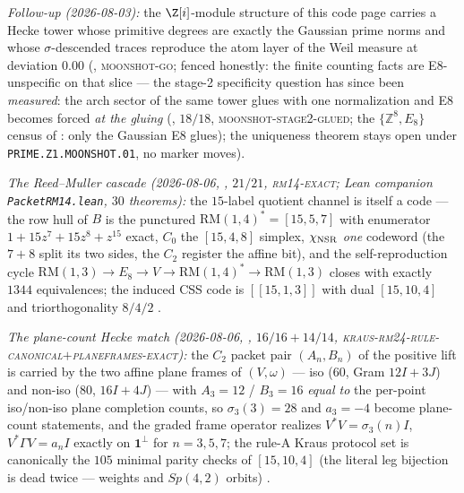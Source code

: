 \emph{Follow-up (2026-08-03):} the $\Z[i]$-module structure of this
code page carries a Hecke tower whose primitive degrees are exactly
the Gaussian prime norms and whose $\sigma$-descended traces
reproduce the atom layer of the Weil measure at deviation $0.00$
(, \textsc{moonshot-go};
fenced honestly: the finite counting facts are E8-unspecific on that
slice --- the stage-2 specificity question has since been
\emph{measured}: the arch sector of the same tower glues with one
normalization and E8 becomes forced \emph{at the gluing}
(, $18/18$,
\textsc{moonshot-stage2-glued}; the $\{\mathbb{Z}^8,E_8\}$ census of
: only the Gaussian E8 glues);
the uniqueness theorem stays open under
\texttt{PRIME.Z1.MOONSHOT.01}, no marker moves).

\emph{The Reed--Muller cascade (2026-08-06,
, $21/21$, \textsc{rm14-exact};
Lean companion \texttt{PacketRM14.lean}, $30$ theorems):} the
$15$-label quotient channel is itself a code --- the row hull of
$B$ is the punctured $\mathrm{RM}(1,4)^*=[15,5,7]$ with enumerator
$1+15z^7+15z^8+z^{15}$ exact, $C_0$ the $[15,4,8]$ simplex,
$\chi_{\rm NSR}$ \emph{one} codeword (the $7{+}8$ split its two
sides, the $C_2$ register the affine bit), and the
self-reproduction cycle $\mathrm{RM}(1,3)\to E_8\to V\to
\mathrm{RM}(1,4)^*\to\mathrm{RM}(1,3)$ closes with exactly $1344$
equivalences; the induced CSS code is $[[15,1,3]]$ with dual
$[15,10,4]$ and triorthogonality $8/4/2$ \mE.

\emph{The plane-count Hecke match (2026-08-06,
, $16/16+14/14$,
\textsc{kraus-rm24-rule-canonical}$+$\textsc{planeframes-exact}):}
the $C_2$ packet pair $(A_n,B_n)$ of the positive lift is carried
by the two affine plane frames of $(V,\omega)$ --- iso ($60$, Gram
$12I{+}3J$) and non-iso ($80$, $16I{+}4J$) --- with $A_3=12$ /
$B_3=16$ \emph{equal to} the per-point iso/non-iso plane
completion counts, so $\sigma_3(3)=28$ and $a_3=-4$ become
plane-count statements, and the graded frame operator realizes
$V^*V=\sigma_3(n)I$, $V^*\Gamma V=a_nI$ exactly on $\mathbf1^\perp$
for $n=3,5,7$; the rule-A Kraus protocol set is canonically the
$105$ minimal parity checks of $[15,10,4]$ (the literal leg
bijection is dead twice --- weights and $Sp(4,2)$ orbits) \mE.
\smallskip\\

